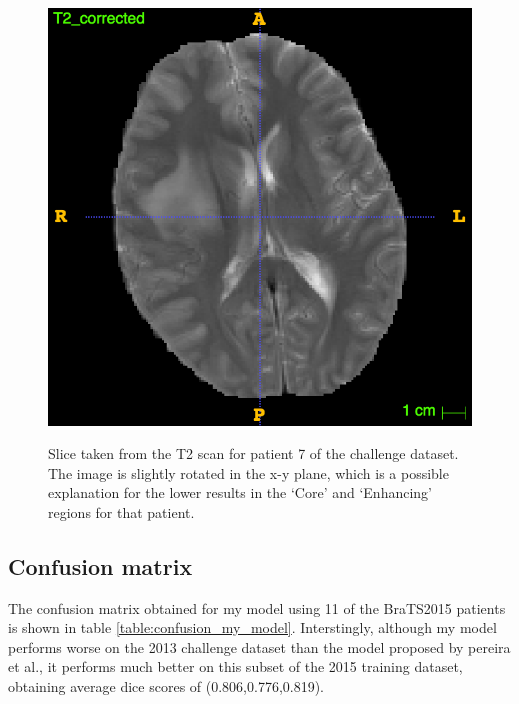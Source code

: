 \documentclass[12pt,a4paper,twoside,openright]{report}
\begin{document}
\begin{figure}[h]
	\centering
	\includegraphics[scale = 0.3]{patient7_t2}
	\label{fig:patient_7_t2}
	\caption{Slice taken from the T2 scan for patient 7 of the challenge dataset. The image is slightly rotated in the x-y plane, which is a possible explanation for the lower results in the `Core' and `Enhancing' regions for that patient.}
\end{figure}

\subsection{Confusion matrix}
The confusion matrix obtained for my model using 11 of the BraTS2015 patients is shown in table \ref{table:confusion_my_model}. Interstingly, although my model performs worse on the 2013 challenge dataset than the model proposed by pereira et al., it performs much better on this subset of the 2015 training dataset, obtaining average dice scores of (0.806,0.776,0.819).
\end{document}
